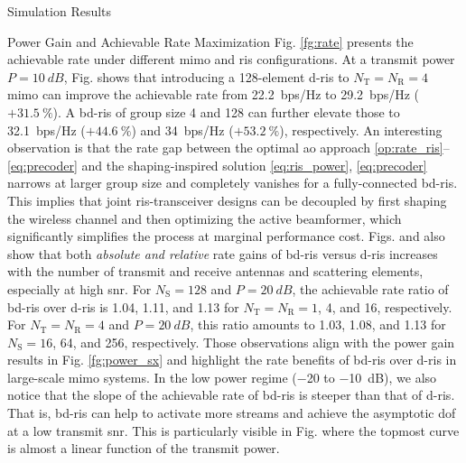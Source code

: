 \documentclass[journal]{IEEEtran}
\begin{document}
\begin{section}{Simulation Results}
\begin{subsection}{Power Gain and Achievable Rate Maximization}
	 Fig. \ref{fg:rate} presents the achievable rate under different \gls{mimo} and \gls{ris} configurations.
	 At a transmit power $P = \qty{10}{dB}$, Fig.  shows that introducing a 128-element \gls{d}-\gls{ris} to $N_\mathrm{T}=N_\mathrm{R}=4$ \gls{mimo} can improve the achievable rate from \qty{22.2}{bps/Hz} to \qty{29.2}{bps/Hz} ($+\qty{31.5}{\percent}$).
	 A \gls{bd}-\gls{ris} of group size 4 and 128 can further elevate those to \qty{32.1}{bps/Hz} ($+\qty{44.6}{\percent}$) and \qty{34}{bps/Hz}  ($+\qty{53.2}{\percent}$), respectively.
	 An interesting observation is that the rate gap between the optimal \gls{ao} approach \eqref{op:rate_ris}--\eqref{eq:precoder} and the shaping-inspired solution \eqref{eq:ris_power}, \eqref{eq:precoder} narrows at larger group size and completely vanishes for a fully-connected \gls{bd}-\gls{ris}.
	 This implies that joint \gls{ris}-transceiver designs can be decoupled by first shaping the wireless channel and then optimizing the active beamformer, which significantly simplifies the process at marginal performance cost.
	 Figs.  and  also show that both \emph{absolute and relative} rate gains of \gls{bd}-\gls{ris} versus \gls{d}-\gls{ris}
	 increases with the number of transmit and receive antennas and scattering elements, especially at high \gls{snr}.
	 For $N_\mathrm{S}=128$ and $P = \qty{20}{dB}$,
	 the achievable rate ratio of \gls{bd}-\gls{ris} over \gls{d}-\gls{ris} is \num{1.04}, \num{1.11}, and \num{1.13} for $N_\mathrm{T}=N_\mathrm{R}=1$, \num{4}, and \num{16}, respectively.
	 For $N_\mathrm{T}=N_\mathrm{R}=4$ and $P = \qty{20}{dB}$, this ratio amounts to \num{1.03}, \num{1.08}, and \num{1.13} for $N_\mathrm{S}=16$, \num{64}, and \num{256}, respectively.
	 Those observations align with the power gain results in Fig. \ref{fg:power_sx} and highlight the rate benefits of \gls{bd}-\gls{ris} over \gls{d}-\gls{ris} in large-scale \gls{mimo} systems.
	 In the low power regime (\num{-20} to \qty{-10}{dB}), we also notice that the slope of the achievable rate of \gls{bd}-\gls{ris} is steeper than that of \gls{d}-\gls{ris}.
	 That is, \gls{bd}-\gls{ris} can help to activate more streams and achieve the asymptotic \gls{dof} at a low transmit \gls{snr}.
	 This is particularly visible in Fig.  where the topmost curve is almost a linear function of the transmit power.

\end{subsection}
\end{section}
\end{document}
